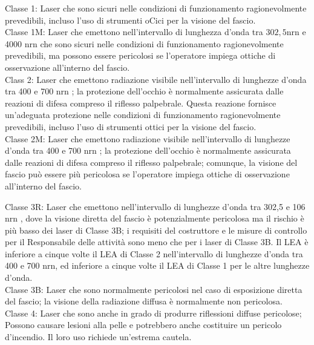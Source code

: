 \documentclass[10pt]{article}
\begin{document}
Classe 1: Laser che sono sicuri nelle condizioni di funzionamento ragionevolmente prevedibili, incluso l'uso di strumenti oCici per la visione del fascio.\\
Classe 1M: Laser che emettono nell'intervallo di lunghezza d'onda tra $302,5 \mathrm{nrn}$ e 4000 nrn che sono sicuri nelle condizioni di funzionamento ragionevolmente prevedibili, ma possono essere pericolosi se l'operatore impiega ottiche di osservazione all'interno del fascio.\\
Class 2: Laser che emettono radiazione visibile nell'intervallo di lunghezze d'onda tra 400 e 700 nrn ; la protezione dell'occhio è normalmente assicurata dalle reazioni di difesa compreso il riflesso palpebrale. Questa reazione fornisce un'adeguata protezione nelle condizioni di funzionamento ragionevolmente prevedibili, incluso l'uso di strumenti ottici per la visione del fascio.\\
Classe 2M: Laser che emettono radiazione visibile nell'intervallo di lunghezze d'onda tra 400 e 700 nrn ; la protezione dell'occhio è normalmente assicurata dalle reazioni di difesa compreso il riflesso palpebrale; comunque, la visione del fascio può essere più pericolosa se l'operatore impiega ottiche di osservazione all'interno del fascio.

Classe 3R: Laser che emettono nell'intervallo di lunghezze d'onda tra 302,5 e 106 nrn , dove la visione diretta del fascio è potenzialmente pericolosa ma il rischio è più basso dei laser di Classe 3B; i requisiti del costruttore e le misure di controllo per il Responsabile delle attività sono meno che per i laser di Classe 3B. Il LEA è inferiore a cinque volte il LEA di Classe 2 nell'intervallo di lunghezze d'onda tra 400 e 700 nrn, ed inferiore a cinque volte il LEA di Classe 1 per le altre lunghezze d'onda.\\
Classe 3B: Laser che sono normalmente pericolosi nel caso di esposizione diretta del fascio; la visione della radiazione diffusa è normalmente non pericolosa.\\
Classe 4: Laser che sono anche in grado di produrre riflessioni diffuse pericolose; Possono causare lesioni alla pelle e potrebbero anche costituire un pericolo d'incendio. Il loro uso richiede un'estrema cautela.
\end{document}
